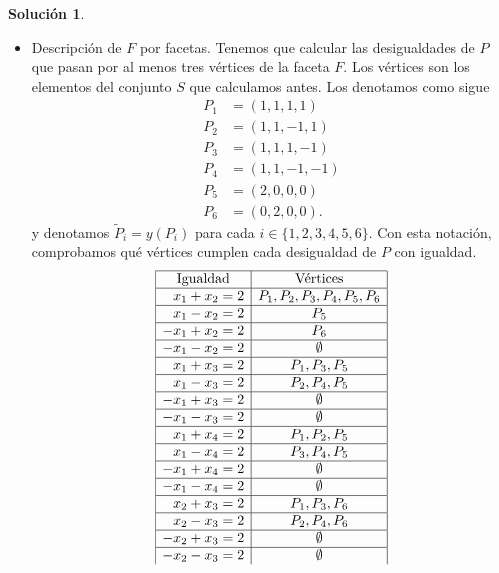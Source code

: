 \documentclass[10pt]{article}
\theoremstyle{definition}
\newtheorem*{sol}{Solución}
\begin{document}
\begin{sol}
\begin{enumerate}[(a)]
\begin{itemize}
        \item Descripción de $F$ por facetas.
        Tenemos que calcular las desigualdades de $P$ que pasan por al menos tres vértices de la faceta $F$. Los vértices son los elementos del conjunto $S$ que calculamos antes. Los denotamos como sigue
        \begin{align*}
            P_1 & = (1,1,1,1)\\
            P_2 & = (1,1,-1,1)\\
            P_3 & = (1,1,1,-1)\\
            P_4 & = (1,1,-1,-1)\\
            P_5 & = (2,0,0,0)\\
            P_6 & = (0,2,0,0).
        \end{align*}
        y denotamos $\tilde{P}_i=y(P_i)$ para cada $i\in\{1,2,3,4,5,6\}$.
    Con esta notación, comprobamos qué vértices cumplen cada desigualdad de $P$ con igualdad.
    \[\begin{array}{|r|c|}
        \hline \multicolumn{1}{|c|}{\text{Igualdad}} & \text{Vértices}  \\
        \hline x_1+x_2=2 & P_1,P_2,P_3,P_4,P_5,P_6\\
        \hline x_1-x_2=2 & P_5\\
        \hline -x_1+x_2=2 & P_6\\
        \hline -x_1-x_2=2 & \emptyset\\
        
        \hline x_1+x_3=2 & P_1,P_3,P_5\\
        \hline x_1-x_3=2 & P_2,P_4,P_5\\
        \hline -x_1+x_3=2 & \emptyset\\
        \hline -x_1-x_3=2 & \emptyset\\
        
        \hline x_1+x_4=2 & P_1,P_2,P_5\\
        \hline x_1-x_4=2 & P_3,P_4,P_5\\
        \hline -x_1+x_4=2 & \emptyset\\
        \hline -x_1-x_4=2 & \emptyset\\
        
        \hline x_2+x_3=2 & P_1,P_3,P_6\\
        \hline x_2-x_3=2 & P_2,P_4,P_6\\
        \hline -x_2+x_3=2 & \emptyset\\
        \hline -x_2-x_3=2 & \emptyset\\
        

\end{array}\]
\end{itemize}
\end{enumerate}
\end{sol}
\end{document}
